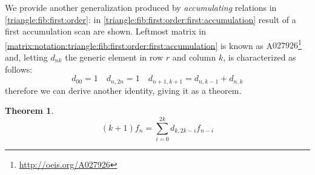 \documentclass[a4paper,dottedtoc,headinclude,footinclude]{report} %
\theoremstyle{plain}
\newtheorem{thm}{Theorem}[section]
\begin{document}
    We provide another generalization produced by \emph{accumulating}
    relations in \autoref{triangle:fib:first:order}: in 
    \autoref{triangle:fib:first:order:first:accumulation} result of a first
    accumulation scan are shown. Leftmost matrix in 
    \autoref{matrix:notation:triangle:fib:first:order:first:accumulation}
    is known as A$027926$\footnote{\url{http://oeis.org/A027926}} and, 
    letting $d_{nk}$ the generic element in row $r$ and column $k$, is
    characterized as follows:
    \begin{equation}
        \label{eq:triangle:rec:rule:fib}
        d_{00} = 1 \quad d_{n, 2n} = 1 \quad d_{n+1,k+1} = d_{n, k-1} + d_{n, k}  
    \end{equation}
    therefore we can derive another identity, giving it as a theorem.

    \begin{thm}
        \begin{displaymath}
            \left(k + 1\right) f_{n} = \sum_{i=0}^{2 k}  d_{k,2 k - i} f_{n - i}
        \end{displaymath}
    \end{thm}
\end{document}
